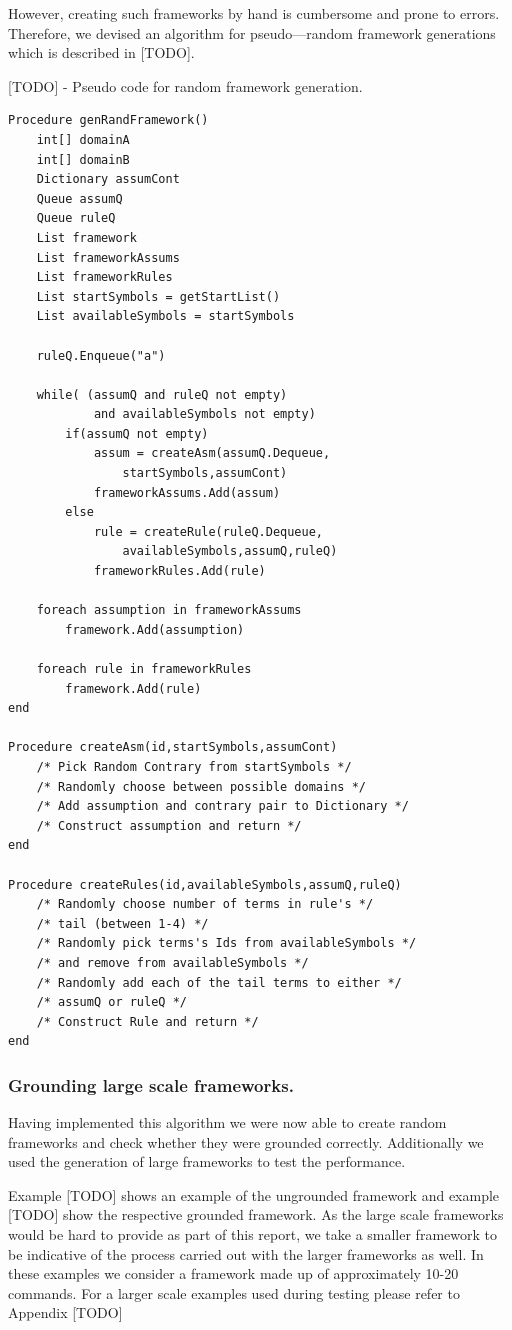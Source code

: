However, creating such frameworks by hand is cumbersome and prone to errors. Therefore, we devised an algorithm for pseudo---random framework generations which is described in [TODO].

[TODO] - Pseudo code for random framework generation.
\begin{Verbatim}[frame=single]
Procedure genRandFramework()
	int[] domainA
	int[] domainB
	Dictionary assumCont
	Queue assumQ
	Queue ruleQ
	List framework
	List frameworkAssums
	List frameworkRules
	List startSymbols = getStartList()
	List availableSymbols = startSymbols
	
	ruleQ.Enqueue("a")
	
	while( (assumQ and ruleQ not empty) 
			and availableSymbols not empty)
		if(assumQ not empty)
			assum = createAsm(assumQ.Dequeue,
				startSymbols,assumCont)
			frameworkAssums.Add(assum)
		else
			rule = createRule(ruleQ.Dequeue,
				availableSymbols,assumQ,ruleQ)
			frameworkRules.Add(rule)
			
	foreach assumption in frameworkAssums
		framework.Add(assumption)
	
	foreach rule in frameworkRules
		framework.Add(rule)
end
		
Procedure createAsm(id,startSymbols,assumCont)
	/* Pick Random Contrary from startSymbols */
	/* Randomly choose between possible domains */
	/* Add assumption and contrary pair to Dictionary */
	/* Construct assumption and return */
end

Procedure createRules(id,availableSymbols,assumQ,ruleQ)
	/* Randomly choose number of terms in rule's */
	/* tail (between 1-4) */
	/* Randomly pick terms's Ids from availableSymbols */
	/* and remove from availableSymbols */
	/* Randomly add each of the tail terms to either */
	/* assumQ or ruleQ */
	/* Construct Rule and return */
end

\end{Verbatim}

\subsubsection{Grounding large scale frameworks.}

Having implemented this algorithm we were now able to create random frameworks and check whether they were grounded correctly. Additionally we used the generation of large frameworks to test the performance.

Example [TODO] shows an example of the ungrounded framework and example [TODO] show the respective grounded framework. As the large scale frameworks would be hard to provide as part of this report, we take a smaller framework to be indicative of the process carried out with the larger frameworks as well. In these examples we consider a framework made up of approximately 10-20 commands. For a larger scale examples used during testing please refer to Appendix [TODO]

